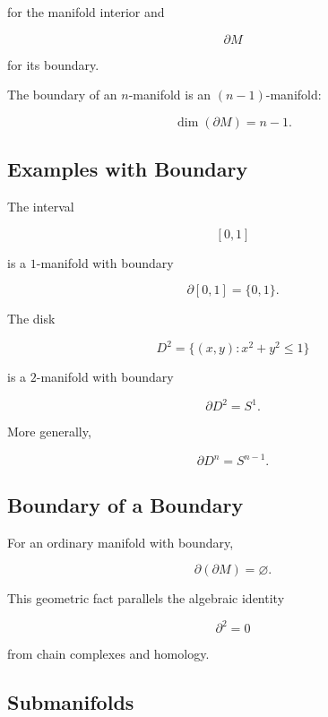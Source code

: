 for the manifold interior and

\[
\boxed{
\partial M
}
\]

for its boundary.

The boundary of an \(n\)-manifold is an \((n-1)\)-manifold:

\[
\boxed{
\dim(\partial M)=n-1.
}
\]

\subsection{Examples with Boundary}
\label{subsec:examples-manifolds-boundary}

The interval

\[
[0,1]
\]

is a \(1\)-manifold with boundary

\[
\boxed{
\partial[0,1]=\{0,1\}.
}
\]

The disk

\[
D^2
=
\{(x,y):x^2+y^2\leq1\}
\]

is a \(2\)-manifold with boundary

\[
\boxed{
\partial D^2=S^1.
}
\]

More generally,

\[
\boxed{
\partial D^n=S^{n-1}.
}
\]

\subsection{Boundary of a Boundary}
\label{subsec:boundary-boundary-manifolds}

For an ordinary manifold with boundary,

\[
\boxed{
\partial(\partial M)=\varnothing.
}
\]

This geometric fact parallels the algebraic identity

\[
\boxed{
\partial^2=0
}
\]

from chain complexes and homology.

\subsection{Submanifolds}
\label{subsec:submanifolds}

